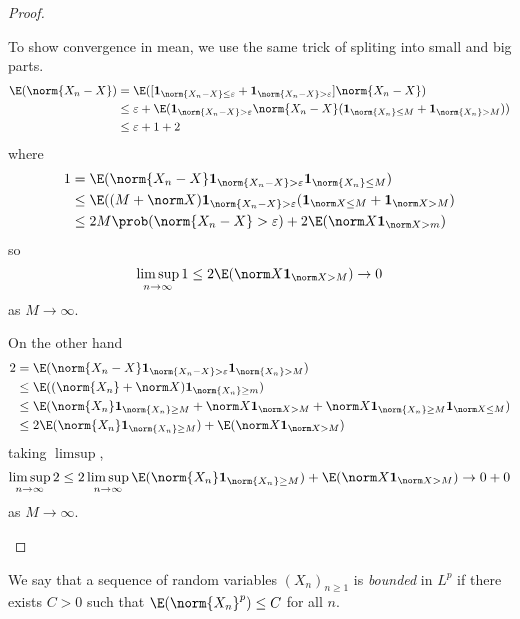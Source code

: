\documentclass[a4paper]{article}
\renewcommand{\P}{\prob} %
\begin{document}
\begin{proof}
\begin{enumerate}
    To show convergence in mean, we use the same trick of spliting into small and big parts.
    \begin{align*}
      \E(\norm{X_n - X})
      &= \E([\mathbf 1_{\norm{X_n - X} \leq \varepsilon} + \mathbf 1_{\norm{X_n - X} > \varepsilon}] \norm{X_n - X}) \\
      &\leq \varepsilon + \E(\mathbf 1_{\norm{X_n - X} > \varepsilon} \norm{X_n - X} (\mathbf 1_{\norm{X_n} \leq M} + \mathbf 1_{\norm{X_n} > M})) \\
      &\leq \varepsilon + 1 + 2
    \end{align*}
    where
    \begin{align*}
      1
      &= \E(\norm{X_n - X} \mathbf 1_{\norm{X_n - X} > \varepsilon} \mathbf 1_{\norm{X_n} \leq M}) \\
      &\leq \E((M + \norm X) \mathbf 1_{\norm{X_n - X} > \varepsilon} (\mathbf 1_{\norm X \leq M} + \mathbf 1_{\norm X > M}) \\
      &\leq 2M \P(\norm{X_n - X} > \varepsilon) + 2 \E(\norm X \mathbf 1_{\norm X > m})
    \end{align*}
    so
    \[
      \limsup_{n \to \infty} 1 \leq 2 \E(\norm X \mathbf 1_{\norm X > M}) \to 0
    \]
    as \(M \to \infty\).

    On the other hand
    \begin{align*}
      2
      &= \E(\norm{X_n - X} \mathbf 1_{\norm{X_n - X} > \varepsilon} \mathbf 1_{\norm{X_n} > M}) \\
      &\leq \E((\norm{X_n} + \norm X) \mathbf 1_{\norm{X_n} \geq m}) \\
      &\leq \E(\norm{X_n} \mathbf 1_{\norm{X_n} \geq M} + \norm X \mathbf 1_{\norm X > M} + \norm X \mathbf 1_{\norm{X_n} \geq M} \mathbf 1_{\norm X \leq M}) \\
      &\leq 2 \E(\norm{X_n} \mathbf 1_{\norm{X_n} \geq M}) + \E(\norm X \mathbf 1_{\norm X > M})
    \end{align*}
    taking \(\limsup\),
    \[
      \limsup_{n \to \infty} 2 \leq 2 \limsup_{n \to \infty} \E(\norm{X_n} \mathbf 1_{\norm{X_n} \geq M}) + \E(\norm X \mathbf 1_{\norm X > M}) \to 0 + 0
    \]
    as \(M \to \infty\).
  \end{enumerate}
\end{proof}

\begin{definition}
  We say that a sequence of random variables \((X_n)_{n \geq 1}\) is \emph{bounded} in \(L^p\) if there exists \(C > 0\) such that \(\E(\norm{X_n}^p) \leq C\) for all \(n\).
\end{definition}
\end{document}
